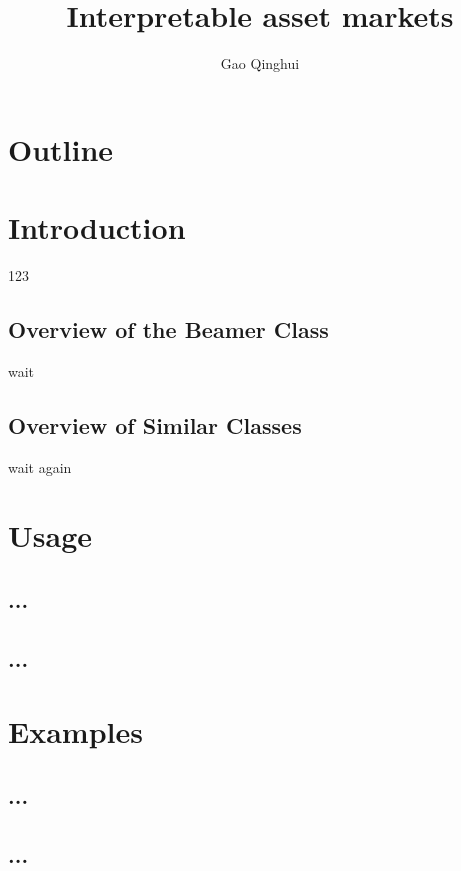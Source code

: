 \documentclass{beamer}
\title{Interpretable asset markets}
\author{Gao Qinghui}
\begin{document}
\begin{frame}
    \titlepage
\end{frame}

\section*{Outline}
\begin{frame}
    \tableofcontents
\end{frame}

\section{Introduction}

123

\subsection{Overview of the Beamer Class}

wait

\subsection{Overview of Similar Classes}

wait again

\section{Usage}
\subsection{...}
\subsection{...}

\section{Examples}
\subsection{...}
\subsection{...}

\begin{frame}
\end{frame} %
\end{document}
